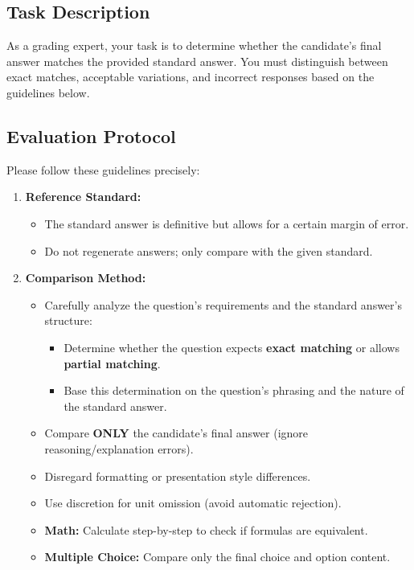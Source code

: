 \onecolumn


\begin{tcolorbox}[
    breakable,             
    rounded corners,
    width=\textwidth,
    title={T1 and T2 JUDGE PROMPT},
    fonttitle=\normalsize\bfseries,
    coltitle=white,
    toptitle=2mm, bottomtitle=2mm, left=3mm, right=3mm, top=3mm, bottom=3mm,
]

\subsection*{Task Description}

As a grading expert, your task is to determine whether the candidate's final answer matches the provided standard answer. You must distinguish between exact matches, acceptable variations, and incorrect responses based on the guidelines below.

\subsection*{Evaluation Protocol}

Please follow these guidelines precisely:

\begin{enumerate}
    \item \textbf{Reference Standard:}
    \begin{itemize}
        \item The standard answer is definitive but allows for a certain margin of error.
        \item Do not regenerate answers; only compare with the given standard.
    \end{itemize}

    \item \textbf{Comparison Method:}
    \begin{itemize}
        \item Carefully analyze the question's requirements and the standard answer's structure:
        \begin{itemize}
            \item Determine whether the question expects \textbf{exact matching} or allows \textbf{partial matching}.
            \item Base this determination on the question's phrasing and the nature of the standard answer.
        \end{itemize}
        \item Compare \textbf{ONLY} the candidate's final answer (ignore reasoning/explanation errors).
        \item Disregard formatting or presentation style differences.
        \item Use discretion for unit omission (avoid automatic rejection).
        \item \textbf{Math:} Calculate step-by-step to check if formulas are equivalent.
        \item \textbf{Multiple Choice:} Compare only the final choice and option content.
    \end{itemize}


\end{enumerate}
\end{tcolorbox}
